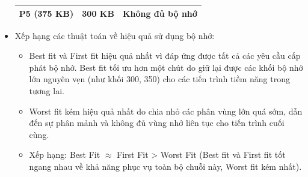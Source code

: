 \documentclass[12pt, letterpaper]{article}
\begin{document}
\begin{itemize}
\begin{table}[H]
\begin{tabular}{c|c|c}
    P5 (375 KB) & 300 KB & Không đủ bộ nhớ \\
    \bottomrule
    \end{tabular}
    \end{table}
    \item Xếp hạng các thuật toán về hiệu quả sử dụng bộ nhớ:
    \begin{itemize}
        \item Best fit và First fit hiệu quả nhất vì đáp ứng được tất cả các yêu cầu cấp phát bộ nhớ. Best fit tối ưu hơn một chút do giữ lại được các khối bộ nhớ lớn nguyên vẹn (như khối 300, 350) cho các tiến trình tiềm năng trong tương lai.
        \item Worst fit kém hiệu quả nhất do chia nhỏ các phân vùng lớn quá sớm, dẫn đến sự phân mảnh và không đủ vùng nhớ liên tục cho tiến trình cuối cùng.
        \item Xếp hạng: Best Fit $\approx$ First Fit > Worst Fit (Best fit và First fit tốt ngang nhau về khả năng phục vụ toàn bộ chuỗi này, Worst fit kém nhất).
    \end{itemize}
\end{itemize}
\end{document}
